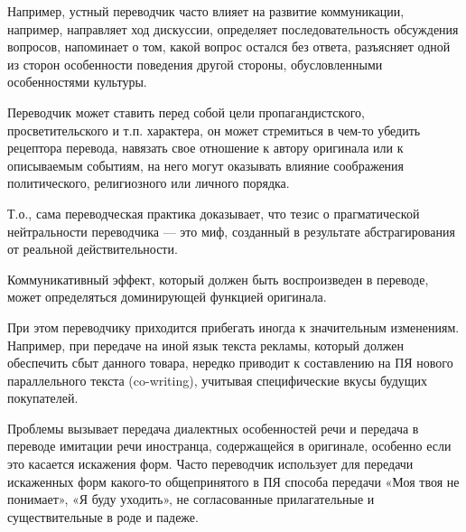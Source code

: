 Например, устный переводчик часто влияет на развитие коммуникации, например, направляет ход дискуссии, определяет последовательность обсуждения вопросов, напоминает о том, какой вопрос остался без ответа, разъясняет одной из сторон особенности поведения другой стороны, обусловленными особенностями культуры.

Переводчик может ставить перед собой цели пропагандистского, просветительского и т.п. характера, он может стремиться в чем-то убедить рецептора перевода, навязать свое отношение к автору оригинала или к описываемым событиям, на него могут оказывать влияние соображения политического, религиозного или личного порядка.

Т.о., сама переводческая практика доказывает, что тезис о прагматической нейтральности переводчика --- это миф, созданный в результате абстрагирования от реальной действительности.

Коммуникативный эффект, который должен быть воспроизведен в переводе, может определяться доминирующей функцией оригинала.

При этом переводчику приходится прибегать иногда к значительным изменениям. Например, при передаче на иной язык текста рекламы, который должен обеспечить сбыт данного товара, нередко приводит к составлению на ПЯ нового параллельного текста (co-writing), учитывая специфические вкусы будущих покупателей.

Проблемы вызывает передача диалектных особенностей речи и передача в переводе имитации речи иностранца, содержащейся в оригинале, особенно если это касается искажения форм. Часто переводчик использует для передачи искаженных форм какого-то общепринятого в ПЯ способа передачи «Моя твоя не понимает», «Я буду уходить», не согласованные прилагательные и существительные в роде и падеже.